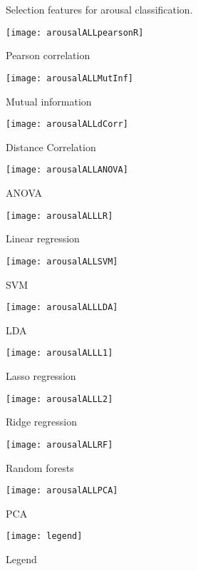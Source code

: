 \clearpage
\begin{figure}[!tbp]
  \centering
  \caption{Selection features for arousal classification.\label{arousalpies}}
  \begin{minipage}[b]{0.3\textwidth}
    \texttt{[image: arousalALLpearsonR]}
    \caption{Pearson correlation}
  \end{minipage}
  \hfill
  \begin{minipage}[b]{0.3\textwidth}
    \texttt{[image: arousalALLMutInf]}
    \caption{Mutual information}
  \end{minipage}
  \hfill
  \begin{minipage}[b]{0.3\textwidth}
    \texttt{[image: arousalALLdCorr]}
    \caption{Distance Correlation}
  \end{minipage}
  
  \begin{minipage}[b]{0.3\textwidth}
    \texttt{[image: arousalALLANOVA]}
    \caption{ANOVA}
  \end{minipage}
  \hfill
  \begin{minipage}[b]{0.3\textwidth}
    \texttt{[image: arousalALLLR]}
    \caption{Linear regression}
  \end{minipage}
  \hfill
  \begin{minipage}[b]{0.3\textwidth}
    \texttt{[image: arousalALLSVM]}
    \caption{SVM}
  \end{minipage}
  
  \begin{minipage}[b]{0.3\textwidth}
    \texttt{[image: arousalALLLDA]}
    \caption{LDA}
  \end{minipage}
  \hfill
  \begin{minipage}[b]{0.3\textwidth}
    \texttt{[image: arousalALLL1]}
    \caption{Lasso regression}
  \end{minipage}
  \hfill
  \begin{minipage}[b]{0.3\textwidth}
    \texttt{[image: arousalALLL2]}
    \caption{Ridge regression}
  \end{minipage}
  
  \begin{minipage}[b]{0.3\textwidth}
    \texttt{[image: arousalALLRF]}
    \caption{Random forests}
  \end{minipage}
  \hfill
  \begin{minipage}[b]{0.3\textwidth}
    \texttt{[image: arousalALLPCA]} %
    \caption{PCA}
  \end{minipage}
  \hfill
  \begin{minipage}[b]{0.3\textwidth}
    \texttt{[image: legend]}
    \caption{Legend\label{arousalpieslegend}}
  \end{minipage}
\end{figure}

